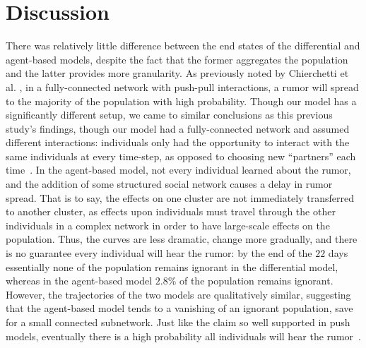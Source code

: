 \section{Discussion }
\label{sec:discussion}

There was relatively little difference between the end states of the differential and agent-based models, despite the fact that the former aggregates the population and the latter provides more granularity.
As previously noted by Chierchetti et al.
\cite{chierchetti-2010}, in a fully-connected network with push-pull interactions, a rumor will spread to the majority of the population with high probability.
Though our model has a significantly different setup, we came to similar conclusions as this previous study's findings, though our model had a fully-connected network and assumed different interactions: individuals only had the opportunity to interact with the same individuals at every time-step, as opposed to choosing new ``partners'' each time~\cite{chierchetti-2010}.
In the agent-based model, not every individual learned about the rumor, and the addition of some structured social network causes a delay in rumor spread.
That is to say, the effects on one cluster are not immediately transferred to another cluster, as effects upon individuals must travel through the other individuals in a complex network in order to have large-scale effects on the population.
Thus, the curves are less dramatic, change more gradually, and there is no guarantee every individual will hear the rumor: by the end of the $ 22 $ days essentially none of the population remains ignorant in the differential model, whereas in the agent-based model $ 2.8\% $ of the population remains ignorant.
However, the trajectories of the two models are qualitatively similar, suggesting that the agent-based model tends to a vanishing of an ignorant population, save for a small connected subnetwork.
Just like the claim so well supported in push models, eventually there is a high probability all individuals will hear the rumor~\cite{pittel-1987, angelopoulos-2009}.

